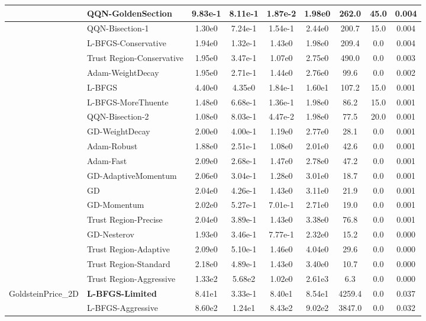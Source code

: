 \documentclass{article}
\begin{document}
\begin{longtable}{|l|l|c|c|c|c|c|c|c|}
\hline
 & QQN-GoldenSection & 9.83e-1 & 8.11e-1 & 1.87e-2 & 1.98e0 & 262.0 & 45.0 & 0.004 \\
\hline
 & QQN-Bisection-1 & 1.30e0 & 7.24e-1 & 1.54e-1 & 2.44e0 & 200.7 & 15.0 & 0.004 \\
\hline
 & L-BFGS-Conservative & 1.94e0 & 1.32e-1 & 1.43e0 & 1.98e0 & 209.4 & 0.0 & 0.004 \\
\hline
 & Trust Region-Conservative & 1.95e0 & 3.47e-1 & 1.07e0 & 2.75e0 & 490.0 & 0.0 & 0.003 \\
\hline
 & Adam-WeightDecay & 1.95e0 & 2.71e-1 & 1.44e0 & 2.76e0 & 99.6 & 0.0 & 0.002 \\
\hline
 & L-BFGS & 4.40e0 & 4.35e0 & 1.84e-1 & 1.60e1 & 107.2 & 15.0 & 0.001 \\
\hline
 & L-BFGS-MoreThuente & 1.48e0 & 6.68e-1 & 1.36e-1 & 1.98e0 & 86.2 & 15.0 & 0.001 \\
\hline
 & QQN-Bisection-2 & 1.08e0 & 8.03e-1 & 4.47e-2 & 1.98e0 & 77.5 & 20.0 & 0.001 \\
\hline
 & GD-WeightDecay & 2.00e0 & 4.00e-1 & 1.19e0 & 2.77e0 & 28.1 & 0.0 & 0.001 \\
\hline
 & Adam-Robust & 1.88e0 & 2.51e-1 & 1.08e0 & 2.01e0 & 42.6 & 0.0 & 0.001 \\
\hline
 & Adam-Fast & 2.09e0 & 2.68e-1 & 1.47e0 & 2.78e0 & 47.2 & 0.0 & 0.001 \\
\hline
 & GD-AdaptiveMomentum & 2.06e0 & 3.04e-1 & 1.28e0 & 3.01e0 & 18.7 & 0.0 & 0.001 \\
\hline
 & GD & 2.04e0 & 4.26e-1 & 1.43e0 & 3.11e0 & 21.9 & 0.0 & 0.001 \\
\hline
 & GD-Momentum & 2.02e0 & 5.27e-1 & 7.01e-1 & 2.71e0 & 19.0 & 0.0 & 0.001 \\
\hline
 & Trust Region-Precise & 2.04e0 & 3.89e-1 & 1.43e0 & 3.38e0 & 76.8 & 0.0 & 0.001 \\
\hline
 & GD-Nesterov & 1.93e0 & 3.46e-1 & 7.77e-1 & 2.32e0 & 15.2 & 0.0 & 0.000 \\
\hline
 & Trust Region-Adaptive & 2.09e0 & 5.10e-1 & 1.46e0 & 4.04e0 & 29.6 & 0.0 & 0.000 \\
\hline
 & Trust Region-Standard & 2.18e0 & 4.89e-1 & 1.43e0 & 3.40e0 & 10.7 & 0.0 & 0.000 \\
\hline
 & Trust Region-Aggressive & 1.33e2 & 5.68e2 & 1.02e0 & 2.61e3 & 6.3 & 0.0 & 0.000 \\
GoldsteinPrice\_2D & \textbf{L-BFGS-Limited} & 8.41e1 & 3.33e-1 & 8.40e1 & 8.54e1 & 4259.4 & 0.0 & 0.037 \\
\hline
 & L-BFGS-Aggressive & 8.60e2 & 1.24e1 & 8.43e2 & 9.02e2 & 3847.0 & 0.0 & 0.032 \\

\end{longtable}
\end{document}
